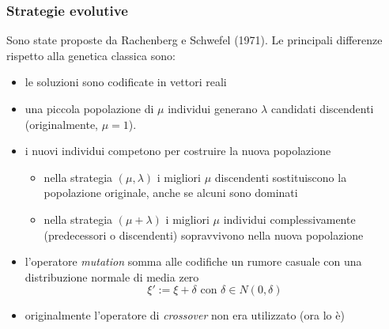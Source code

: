 \documentclass{article}
\begin{document}
\subsubsection{Strategie evolutive}
Sono state proposte da Rachenberg e Schwefel (1971). Le principali differenze
rispetto alla genetica classica sono:
\begin{itemize}
    \item le soluzioni sono codificate in vettori reali
    \item una piccola popolazione di $\mu$ individui generano $\lambda$ candidati
    discendenti (originalmente, $\mu=1$).
    \item i nuovi individui competono per costruire la nuova popolazione
    \begin{itemize}
        \item nella strategia $(\mu,\lambda)$ i migliori $\mu$ discendenti
        sostituiscono la popolazione originale, anche se alcuni sono dominati
        \item nella strategia $(\mu+\lambda)$ i migliori $\mu$ individui
        complessivamente (predecessori o discendenti) sopravvivono nella nuova
        popolazione
    \end{itemize}
    \item l'operatore \textit{mutation} somma alle codifiche un rumore casuale
    con una distribuzione normale di media zero
    $$\xi':=\xi+\delta\text{ con }\delta\in N(0,\delta)$$
    \item originalmente l'operatore di \textit{crossover} non era utilizzato (ora lo è)
\end{itemize}
\end{document}
